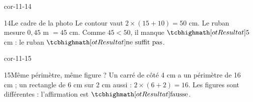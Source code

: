 \begin{blocLivre}{cor-11-14}\begin{corrige}{14}{Le cadre de la photo}
Le contour vaut $2\times(15+10)=50$ cm. Le ruban mesure $0{,}45$ m $=45$ cm. Comme $45<50$, il manque $\res5$ cm : le ruban $\res{\text{ne suffit pas}}$.
\end{corrige}\end{blocLivre}
\begin{blocLivre}{cor-11-15}\begin{corrige}{15}{Même périmètre, même figure ?}
Un carré de côté 4 cm a un périmètre de 16 cm ; un rectangle de 6 cm sur 2 cm aussi : $2\times(6+2)=16$. Les figures sont différentes : l’affirmation est $\res{\text{fausse}}$.
\end{corrige}\end{blocLivre}
